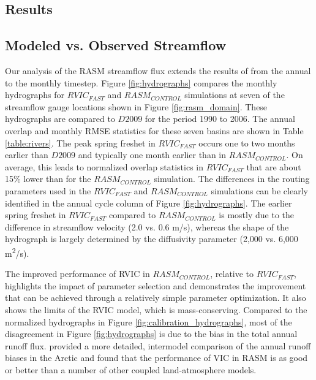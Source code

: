 \documentclass[jgrga, draft]{agutex}
\begin{document}
\begin{article}
\section{Results}
\label{sec:results}

\subsection{Modeled vs. Observed Streamflow}
\label{sec:hydrographs}

Our analysis of the RASM streamflow flux extends the results of \citet{Hamman_2016} from the annual to the monthly timestep.
Figure \ref{fig:hydrographs} compares the monthly hydrographs for $RVIC_{FAST}$ and $RASM_{CONTROL}$ simulations at seven of the streamflow gauge locations shown in Figure \ref{fig:rasm_domain}.
These hydrographs are compared to $D2009$ for the period 1990 to 2006.
The annual overlap and monthly RMSE statistics for these seven basins are shown in Table \ref{table:rivers}.
The peak spring freshet in $RVIC_{FAST}$ occurs one to two months earlier than $D2009$ and typically one month earlier than in $RASM_{CONTROL}$.
On average, this leads to normalized overlap statistics in $RVIC_{FAST}$ that are about 15\% lower than for the $RASM_{CONTROL}$ simulation.
The differences in the routing parameters used in the $RVIC_{FAST}$ and $RASM_{CONTROL}$ simulations can be clearly identified in the annual cycle column of Figure \ref{fig:hydrographs}.
The earlier spring freshet in $RVIC_{FAST}$ compared to $RASM_{CONTROL}$ is mostly due to the difference in streamflow velocity (2.0 vs. 0.6 m/s), whereas the shape of the hydrograph is largely determined by the diffusivity parameter (2,000 vs. 6,000 m\textsuperscript{2}/s).

The improved performance of RVIC in $RASM_{CONTROL}$, relative to $RVIC_{FAST}$, highlights the impact of parameter selection and demonstrates the improvement that can be achieved through a relatively simple parameter optimization.
It also shows the limits of the RVIC model, which is mass-conserving.
Compared to the normalized hydrographs in Figure \ref{fig:calibration_hydrographs}, most of the disagreement in Figure \ref{fig:hydrographs} is due to the bias in the total annual runoff flux.
\citet{Hamman_2016} provided a more detailed, intermodel comparison of the annual runoff biases in the Arctic and found that the performance of VIC in RASM is as good or better than a number of other coupled land-atmosphere models.


\end{article}
\end{document}
